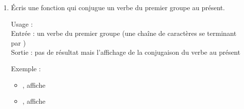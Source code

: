 \documentclass[11pt,class=report,crop=false]{standalone}
\begin{document}
\begin{activite}
\begin{enumerate}
  \item Écris une fonction  qui conjugue un verbe du premier groupe au présent.
  
  \medskip
  
  \begin{fonction}
  Usage :  \\
  Entrée : un verbe du premier groupe (une chaîne de caractères se terminant par ) \\
  Sortie : pas de résultat mais l'affichage de la conjugaison du verbe au présent
  
  \bigskip
    
  Exemple : 
  \begin{itemize}
    \item {}, affiche 
    
    \item {}, affiche 
    
  \end{itemize}   
  \end{fonction}


\end{enumerate} 
\end{activite}


\bigskip
\bigskip
\end{document}
